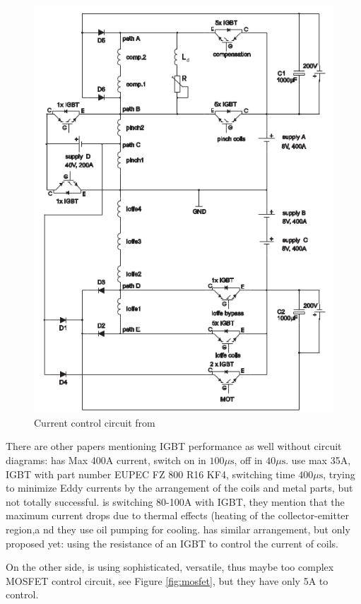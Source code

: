 \documentclass[12pt,a4paper]{article}
\begin{document}
\begin{figure}[ht!]
\centering
\includegraphics[width=120mm]{multipath_switching.png}
\caption{Current control circuit from \citet{Dieckmann2001}}
\label{fig:multipath}
\end{figure}

There are other papers mentioning IGBT performance as well without circuit diagrams: \citet{Bolpasi2012} has Max 400A current, switch on in $100 \mu \mathrm{s}$, off in $40 \mu \mathrm{s}$. \citet{Schuricke2011} use max 35A, IGBT with part number EUPEC FZ 800 R16 KF4, switching time $400 \mu \mathrm{s}$, trying to minimize Eddy currents by the arrangement of the coils and metal parts, but not totally successful. \citet{Holynski2012} is switching 80-100A with IGBT, they mention that the maximum current drops due to thermal effects (heating of the collector-emitter region,a nd they use oil pumping for cooling. \citet{Pasquini2007} has similar arrangement, but only proposed yet: using the resistance of an IGBT to control the current of coils.

On the other side, \citet{Pant2011} is using sophisticated, versatile, thus maybe too complex MOSFET control circuit, see Figure \ref{fig:mosfet}, but they have only 5A to control.
\end{document}
